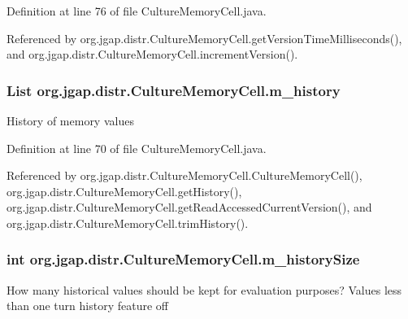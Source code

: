 Definition at line 76 of file Culture\-Memory\-Cell.\-java.



Referenced by org.\-jgap.\-distr.\-Culture\-Memory\-Cell.\-get\-Version\-Time\-Milliseconds(), and org.\-jgap.\-distr.\-Culture\-Memory\-Cell.\-increment\-Version().

\hypertarget{classorg_1_1jgap_1_1distr_1_1_culture_memory_cell_a414986e08e45655b20a1e8a550a1c7b0}{
\subsubsection[{m\-\_\-history}]{\setlength{\rightskip}{0pt plus 5cm}List org.\-jgap.\-distr.\-Culture\-Memory\-Cell.\-m\-\_\-history\hspace{0.3cm}{\ttfamily [private]}}}\label{classorg_1_1jgap_1_1distr_1_1_culture_memory_cell_a414986e08e45655b20a1e8a550a1c7b0}
History of memory values 

Definition at line 70 of file Culture\-Memory\-Cell.\-java.



Referenced by org.\-jgap.\-distr.\-Culture\-Memory\-Cell.\-Culture\-Memory\-Cell(), org.\-jgap.\-distr.\-Culture\-Memory\-Cell.\-get\-History(), org.\-jgap.\-distr.\-Culture\-Memory\-Cell.\-get\-Read\-Accessed\-Current\-Version(), and org.\-jgap.\-distr.\-Culture\-Memory\-Cell.\-trim\-History().

\hypertarget{classorg_1_1jgap_1_1distr_1_1_culture_memory_cell_aafd1fe1c7f2065c1f9b8586b52709f08}{
\subsubsection[{m\-\_\-history\-Size}]{\setlength{\rightskip}{0pt plus 5cm}int org.\-jgap.\-distr.\-Culture\-Memory\-Cell.\-m\-\_\-history\-Size\hspace{0.3cm}{\ttfamily [private]}}}\label{classorg_1_1jgap_1_1distr_1_1_culture_memory_cell_aafd1fe1c7f2065c1f9b8586b52709f08}
How many historical values should be kept for evaluation purposes? Values less than one turn history feature off 


